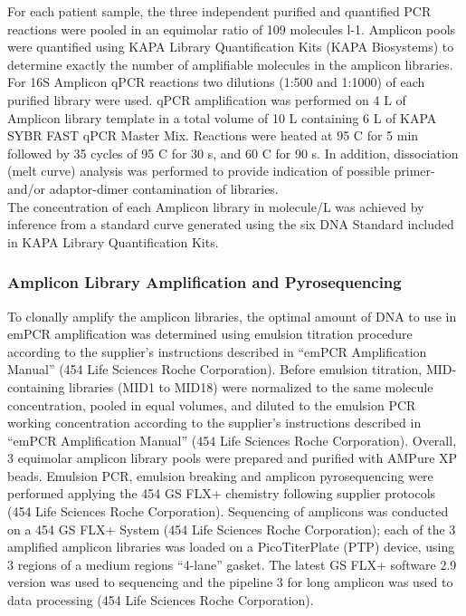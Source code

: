 For each patient sample, the three independent purified and quantified PCR reactions were pooled in an equimolar ratio of 109 molecules {\textmu}l-1. Amplicon pools were quantified using KAPA Library Quantification Kits (KAPA Biosystems) to determine exactly the number of amplifiable molecules in the amplicon libraries. For 16S Amplicon qPCR reactions two dilutions (1:500 and 1:1000) of each purified library were used. qPCR amplification was performed on 4 {\textmu}L of Amplicon library template in a total volume of 10 {\textmu}L containing 6 {\textmu}L of KAPA SYBR{\textregistered} FAST qPCR Master Mix. Reactions were heated at 95 {\textdegree}C for 5 min followed by 35 cycles of 95 {\textdegree}C for 30 s, and 60 {\textdegree}C for 90 s. In addition, dissociation (melt curve) analysis was performed to provide indication of possible primer- and/or adaptor-dimer contamination of libraries.\\ The concentration of each Amplicon library in molecule/{\textmu}L was achieved by inference from a standard curve generated using the six DNA Standard included in KAPA Library Quantification Kits.\\

\subsubsection{Amplicon Library Amplification and Pyrosequencing} 
To clonally amplify the amplicon libraries, the optimal amount of DNA to use in emPCR amplification was determined using emulsion titration procedure according to the supplier's instructions described in ``emPCR Amplification Manual'' (454 Life Sciences Roche Corporation). Before emulsion titration, MID-containing libraries (MID1 to MID18) were normalized to the same molecule concentration, pooled in equal volumes, and diluted to the emulsion PCR working concentration according to the supplier's instructions described in ``emPCR Amplification Manual'' (454 Life Sciences Roche Corporation). Overall, 3 equimolar amplicon library pools were prepared and purified with AMPure XP beads. Emulsion PCR, emulsion breaking and amplicon pyrosequencing were performed applying the 454 GS FLX+ chemistry following supplier protocols (454 Life Sciences Roche Corporation). Sequencing of amplicons was conducted on a 454 GS FLX+ System (454 Life Sciences Roche Corporation); each of the 3 amplified amplicon libraries was loaded on a PicoTiterPlate (PTP) device, using 3 regions of a medium regions ``4-lane'' gasket. The latest GS FLX+ software 2.9 version was used to sequencing and the pipeline 3 for long amplicon was used to data processing (454 Life Sciences Roche Corporation).\\

